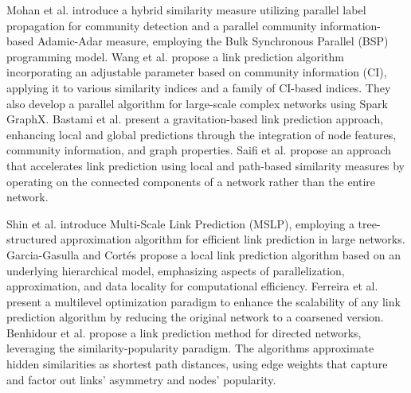 Mohan et al. \cite{mohan2017scalable} introduce a hybrid similarity measure utilizing parallel label propagation for community detection and a parallel community information-based Adamic-Adar measure, employing the Bulk Synchronous Parallel (BSP) programming model. Wang et al. \cite{wang2019link} propose a link prediction algorithm incorporating an adjustable parameter based on community information (CI), applying it to various similarity indices and a family of CI-based indices. They also develop a parallel algorithm for large-scale complex networks using Spark GraphX. Bastami et al. \cite{bastami2019gravitation} present a gravitation-based link prediction approach, enhancing local and global predictions through the integration of node features, community information, and graph properties. Saifi et al. \cite{saifi2023fast} propose an approach that accelerates link prediction using local and path-based similarity measures by operating on the connected components of a network rather than the entire network.

Shin et al. \cite{shin2012multi} introduce Multi-Scale Link Prediction (MSLP), employing a tree-structured approximation algorithm for efficient link prediction in large networks. Garcia-Gasulla and Cort{\'e}s \cite{garcia2014link} propose a local link prediction algorithm based on an underlying hierarchical model, emphasizing aspects of parallelization, approximation, and data locality for computational efficiency. Ferreira et al. \cite{ferreira2019scalability} present a multilevel optimization paradigm to enhance the scalability of any link prediction algorithm by reducing the original network to a coarsened version. Benhidour et al. \cite{benhidour2022approach} propose a link prediction method for directed networks, leveraging the similarity-popularity paradigm. The algorithms approximate hidden similarities as shortest path distances, using edge weights that capture and factor out links' asymmetry and nodes' popularity.


